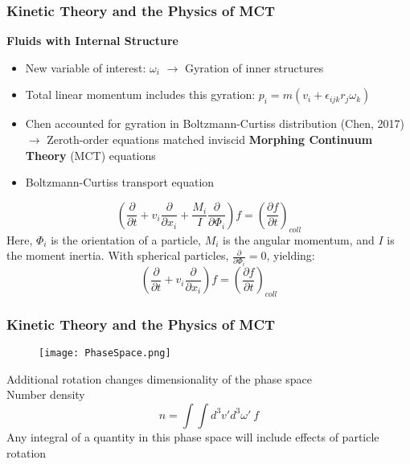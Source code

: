 \documentclass{beamer}
\begin{document}
\begin{frame}
\frametitle{Kinetic Theory and the Physics of MCT}
 \textbf{\large Fluids with Internal Structure}
 \begin{itemize}
  \item New variable of interest: $\omega_{i}$ $\rightarrow$ Gyration of inner 
structures
  \item Total linear momentum includes this gyration: $p_{i} = m(v_{i} + 
\epsilon_{ijk}r_{j}\omega_{k}) $
  \item Chen accounted for gyration in Boltzmann-Curtiss distribution 
(Chen, 2017) $\rightarrow$ Zeroth-order equations matched inviscid 
\textbf{Morphing Continuum Theory} (MCT) equations 
\pause
\item Boltzmann-Curtiss transport equation
 \end{itemize}
\small
  \begin{equation*}
  (\frac{\partial}{\partial t} + v_{i} \frac{\partial}{\partial x_{i}} + 
\frac{M_i}{I}\frac{\partial}{\partial \Phi_i})f = 
(\frac{\partial f}{\partial t})_{coll}
 \end{equation*}
 Here, $\Phi_i$ is the orientation of a particle, $M_i$ is the angular 
momentum, and $I$ is the moment inertia. With spherical particles, 
$\frac{\partial}{\partial \Phi_i} = 0$, yielding:
  \begin{equation*}
  (\frac{\partial}{\partial t} + v_{i} \frac{\partial}{\partial x_{i}})f = 
(\frac{\partial f}{\partial t})_{coll}
 \end{equation*}
\end{frame}
\begin{frame}
 \frametitle{Kinetic Theory and the Physics of MCT}
 \begin{multicols}{2}
 \begin{figure}
 \texttt{[image: PhaseSpace.png]}
\end{figure}
 Additional rotation changes dimensionality of the phase space \\
 \vspace{5mm}
Number density $$n = \int \int d^3v' d^3\omega' \ f$$ 
Any integral of a quantity in this phase space will include effects of particle 
rotation
\end{multicols}
\end{frame}
\end{document}

